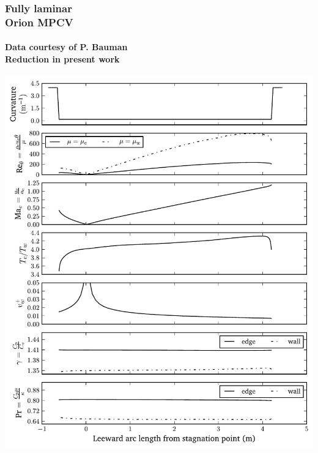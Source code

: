 \documentclass[mathserif]{beamer}
\begin{document}
\begin{frame}
    \frametitle{Fully laminar\\Orion MPCV}
    \framesubtitle{Data courtesy of P. Bauman\\Reduction in present work}
    \vspace{-6.25em}
    \begin{flushright}
        \includegraphics[height=0.99\textheight]{cevisslam_summary1}
    \end{flushright}
\end{frame}
\end{document}
